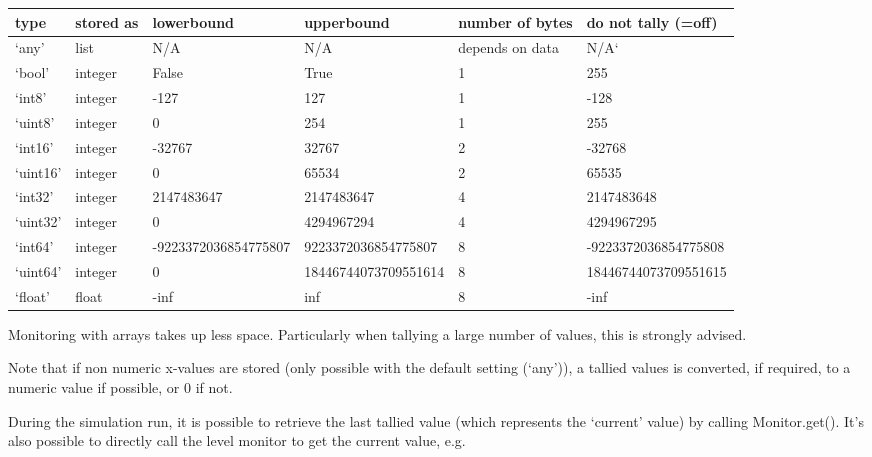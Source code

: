 \documentclass[letterpaper,10pt,english]{sphinxmanual}
\begin{document}
\begin{savenotes}\sphinxattablestart
\centering
\begin{tabulary}{\linewidth}[t]{|T|T|T|T|T|T|}
\hline
\sphinxstyletheadfamily 
type
&\sphinxstyletheadfamily 
stored as
&\sphinxstyletheadfamily 
lowerbound
&\sphinxstyletheadfamily 
upperbound
&\sphinxstyletheadfamily 
number of bytes
&\sphinxstyletheadfamily 
do not tally (=off)
\\
\hline
‘any’
&
list
&
N/A
&
N/A
&
depends on data
&
N/A{}`
\\
\hline
‘bool’
&
integer
&
False
&
True
&
1
&
255
\\
\hline
‘int8’
&
integer
&
-127
&
127
&
1
&
-128
\\
\hline
‘uint8’
&
integer
&
0
&
254
&
1
&
255
\\
\hline
‘int16’
&
integer
&
-32767
&
32767
&
2
&
-32768
\\
\hline
‘uint16’
&
integer
&
0
&
65534
&
2
&
65535
\\
\hline
‘int32’
&
integer
&
2147483647
&
2147483647
&
4
&
2147483648
\\
\hline
‘uint32’
&
integer
&
0
&
4294967294
&
4
&
4294967295
\\
\hline
‘int64’
&
integer
&
-9223372036854775807
&
9223372036854775807
&
8
&
-9223372036854775808
\\
\hline
‘uint64’
&
integer
&
0
&
18446744073709551614
&
8
&
18446744073709551615
\\
\hline
‘float’
&
float
&
-inf
&
inf
&
8
&
-inf
\\
\hline
\end{tabulary}
\par
\sphinxattableend\end{savenotes}

Monitoring with arrays takes up less space. Particularly when tallying a large
number of values, this is strongly advised.

Note that if non numeric x-values are stored (only possible with the default setting (‘any’)),
a tallied values is converted, if required, to a numeric value if possible, or 0 if not.

During the simulation run, it is possible to retrieve the last tallied value (which represents the ‘current’ value)
by calling Monitor.get(). 
It’s also possible to directly call the level monitor to get the current value, e.g.

%
\begin{sphinxVerbatim}[commandchars=\\\{\}]
    
   
\end{sphinxVerbatim}
\end{document}
